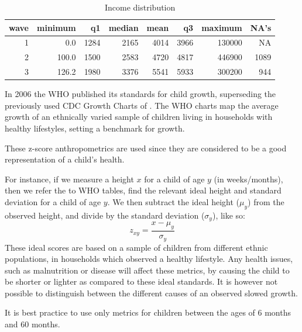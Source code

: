 \documentclass[a4paper,british]{article}\usepackage[]{graphicx}\usepackage[]{color}
\newenvironment{knitrout}{}{} %
\begin{document}
\begin{table}[hb!]
\begin{centering}
\caption{Income distribution}
\label{tab:income}
\par\end{centering}
\begin{knitrout}
\color{fgcolor}


\begin{tabular}{r|r|r|r|r|r|r|r}
\hline
wave & minimum & q1 & median & mean & q3 & maximum & NA's\\
\hline
1 & 0.0 & 1284 & 2165 & 4014 & 3966 & 130000 & NA\\
\hline
2 & 100.0 & 1500 & 2583 & 4720 & 4817 & 446900 & 1089\\
\hline
3 & 126.2 & 1980 & 3376 & 5541 & 5933 & 300200 & 944\\
\hline
\end{tabular}
\end{knitrout}
\end{table}

In 2006 the WHO published its standards for child growth\citep{who2006child},
superseding the previously used CDC Growth Charts of \citep[CDC Growth Charts: United States]{nchs2000cdc}.
The WHO charts map the average growth of an ethnically varied sample
of children living in households with healthy lifestyles, setting
a benchmark for growth.

These z-score anthropometrics are used since they are considered to
be a good representation of a child's health. 

For instance, if we measure a height $x$ for a child of age $y$
(in weeks/months), then we refer the to WHO tables, find the relevant
ideal height and standard deviation for a child of age $y$. We then
subtract the ideal height ($\mu_{y}$) from the observed height, and
divide by the standard deviation ($\sigma_{y}$), like so: 
\[
z_{xy}=\frac{x-\mu_{y}}{\sigma_{y}}
\]
These ideal scores are based on a sample of children from different
ethnic populations, in households which observed a healthy lifestyle.
Any health issues, such as malnutrition or disease will affect these
metrics, by causing the child to be shorter or lighter as compared
to these ideal standards. It is however not possible to distinguish
between the different causes of an observed slowed growth.

It is best practice to use only metrics for children between the ages
of 6 months and 60 months.
\end{document}

